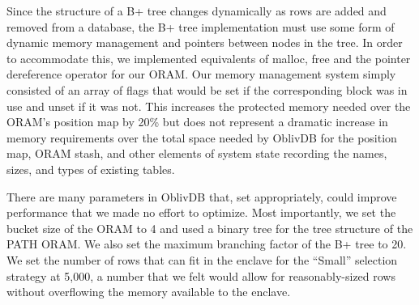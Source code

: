 \documentclass[conference]{IEEEtran}
\def\name/{OblivDB}
\begin{document}
Since the structure of a B+ tree changes dynamically as rows are added and removed from a database, the B+ tree implementation must use some form of dynamic memory management and pointers between nodes in the tree. In order to accommodate this, we implemented equivalents of malloc, free and the pointer dereference operator for our ORAM. Our memory management system simply consisted of an array of flags that would be set if the corresponding block was in use and unset if it was not. This increases the protected memory needed over the ORAM's position map by 20\% but does not represent a dramatic increase in memory requirements over the total space needed by \name/ for the position map, ORAM stash, and other elements of system state recording the names, sizes, and types of existing tables. 

There are many parameters in \name/ that, set appropriately, could improve performance that we made no effort to optimize. Most importantly, we set the bucket size of the ORAM to 4 and used a binary tree for the tree structure of the PATH ORAM. We also set the maximum branching factor of the B+ tree to 20. We set the number of rows that can fit in the enclave for the ``Small'' selection strategy at 5,000, a number that we felt would allow for reasonably-sized rows without overflowing the memory available to the enclave. 
\end{document}
